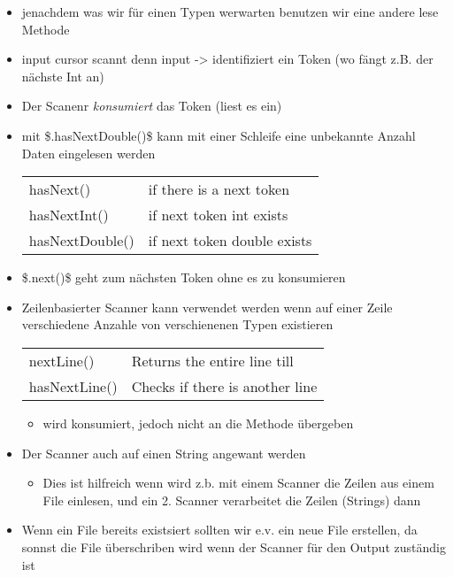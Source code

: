 \documentclass[11pt]{article}
\begin{document}
\begin{itemize}
\item jenachdem was wir für einen Typen werwarten benutzen wir eine andere lese Methode\\
\item input cursor scannt denn input -> identifiziert ein Token (wo fängt z.B. der nächste Int an)\\
\item Der Scanenr \emph{konsumiert} das Token (liest es ein)\\
\item mit \$.hasNextDouble()\$ kann mit einer Schleife eine unbekannte Anzahl Daten eingelesen werden\\
\begin{center}
\begin{tabular}{ll}
hasNext() & if there is a next token\\
hasNextInt() & if next token int exists\\
hasNextDouble() & if next token double exists\\
\end{tabular}
\end{center}
\item \$.next()\$ geht zum nächsten Token ohne es zu konsumieren\\
\item Zeilenbasierter Scanner kann verwendet werden wenn auf einer Zeile verschiedene Anzahle von verschienenen Typen existieren\\
\begin{center}
\begin{tabular}{ll}
nextLine() & Returns the entire line till \n\\
hasNextLine() & Checks if there is another line\\
\end{tabular}
\end{center}
\begin{itemize}
\item \n wird konsumiert, jedoch nicht an die Methode übergeben\\
\end{itemize}
\item Der Scanner auch auf einen String angewant werden\\
\begin{itemize}
\item Dies ist hilfreich wenn wird z.b. mit einem Scanner die Zeilen aus einem File einlesen, und ein 2. Scanner verarbeitet die Zeilen (Strings) dann\\
\end{itemize}
\item Wenn ein File bereits existsiert sollten wir e.v. ein neue File erstellen, da sonnst die File überschriben wird wenn der Scanner für den Output zuständig ist\\
\end{itemize}
\end{document}
